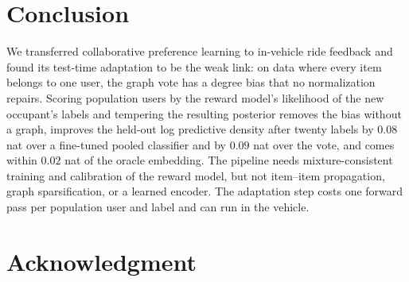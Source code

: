 \documentclass[conference]{IEEEtran}
\newif\ifdraftnotes
\newcommand{\draftnote}[1]{\ifdraftnotes\textcolor{red}{\textbf{[TODO: #1]}}\fi}
\begin{document}
\section{Conclusion}
\label{sec:conclusion}

We transferred collaborative preference learning to in-vehicle ride feedback and found its test-time adaptation to be the weak link: on data where every item belongs to one user, the graph vote has a degree bias that no normalization repairs. Scoring population users by the reward model's likelihood of the new occupant's labels and tempering the resulting posterior removes the bias without a graph, improves the held-out log predictive density after twenty labels by $0.08$ nat over a fine-tuned pooled classifier and by $0.09$ nat over the vote, and comes within $0.02$ nat of the oracle embedding. The pipeline needs mixture-consistent training and calibration of the reward model, but not item--item propagation, graph sparsification, or a learned encoder. The adaptation step costs one forward pass per population user and label and can run in the vehicle.

\section*{Acknowledgment}
\draftnote{Funding, data-collection acknowledgments, conflicts of interest.}



\end{document}
